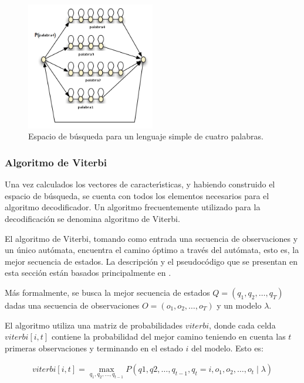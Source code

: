 \begin{figure}[H] 
\centering
\includegraphics[width=0.5\textwidth]{./graphics/espacio.png}
\caption{Espacio de b\'usqueda para un lenguaje simple de cuatro palabras. }
\label{figure:espacio-busqueda}
\end{figure}



\subsubsection{Algoritmo de Viterbi}
Una vez calculados los vectores de caracter{\'\i}sticas, y habiendo construido el espacio de b\'usqueda, se cuenta con
todos los elementos necesarios para el algoritmo decodificador. Un algoritmo frecuentemente utilizado para
la decodificaci\'on se denomina algoritmo de Viterbi.

El algoritmo de Viterbi, tomando como entrada una secuencia de observaciones y un \'unico aut\'omata, 
encuentra el camino \'optimo a trav\'es del aut\'omata, esto es, la mejor secuencia de estados. 
La descripci\'on y el pseudoc\'odigo que se presentan en esta secci\'on
est\'an basados principalmente en \cite{Jurafsky, Rabiner89atutorial}.

M\'as formalmente, se busca la mejor secuencia de estados $Q = (q_1,q_2,\ldots,q_T)$ 
dadas una secuencia de observaciones $O = (o_1,o_2,\ldots,o_T)$ y un modelo $\lambda$.

El algoritmo utiliza una matriz de probabilidades $viterbi$, donde cada celda $viterbi[i,t]$ 
contiene la probabilidad del mejor camino teniendo en cuenta las $t$ primeras observaciones y 
terminando en el estado $i$ del modelo. Esto es:

\begin{align}
	viterbi[i,t] = \displaystyle \max_{q_1,q_2,\ldots,q_{t - 1}} P(q1,q2,\ldots,q_{t - 1},
		q_t = i,o_1,o_2,\ldots,o_t \mid \lambda) 	
\end{align} 

